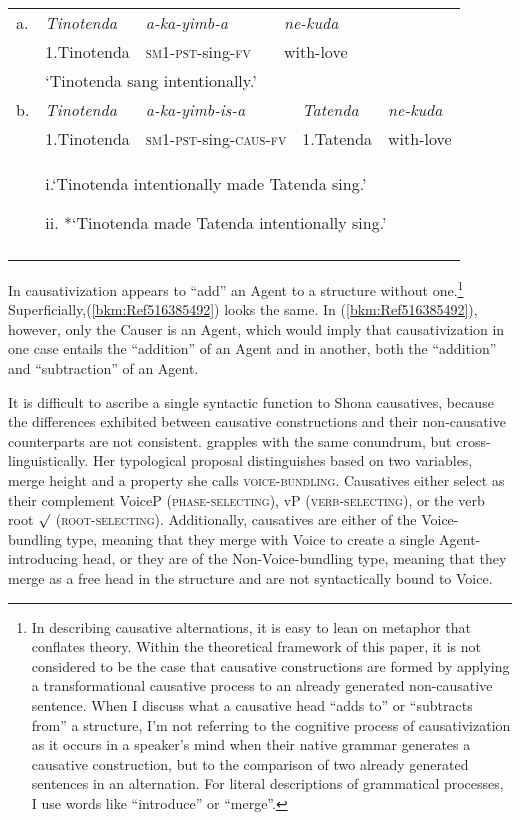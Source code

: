 \documentclass[output=paper,modfonts,nonflat]{langsci/langscibook}
\begin{document}
\tabletail{}
\tablelasttail{}
\begin{tabularx}{\textwidth}{XXXXXX}
\lsptoprule
a. & \textit{Tinotenda} & \textit{a-ka-yimb-a}                & \multicolumn{3}{X}{\textit{ne-kuda}}\\
& 1.Tinotenda & \textsc{sm1-pst-}sing\textsc{{}-fv} & \multicolumn{3}{X}{with-love}\\
& \multicolumn{3}{X}{‘Tinotenda sang intentionally.’} & \multicolumn{2}{X}{}\\
b. & \textit{Tinotenda} & \multicolumn{2}{X}{\textit{a-ka-yimb-is-a}} & \textit{Tatenda} & \textit{ne-kuda}\\
& 1.Tinotenda & \multicolumn{2}{X}{\textsc{sm1-pst-}sing\textsc{{}-caus-fv}} & 1.Tatenda & with-love\\
& \multicolumn{5}{X}{i.‘Tinotenda intentionally made Tatenda sing.’ 

ii. *‘Tinotenda made Tatenda intentionally sing.’}\\
\lspbottomrule
\end{tabularx}
\begin{styleDefault}
In  causativization appears to “add” an Agent to a structure without one.\footnote{In describing causative alternations, it is easy to lean on metaphor that conflates theory. Within the theoretical framework of this paper, it is not considered to be the case that causative constructions are formed by applying a transformational causative process to an already generated non-causative sentence. When I discuss what a causative head “adds to” or “subtracts from” a structure, I’m not referring to the cognitive process of causativization as it occurs in a speaker’s mind when their native grammar generates a causative construction, but to the comparison of two already generated sentences in an alternation. For literal descriptions of grammatical processes, I use words like “introduce” or “merge”.} Superficially,(\ref{bkm:Ref516385492}) looks the same. In (\ref{bkm:Ref516385492}), however, only the Causer is an Agent, which would imply that causativization in one case entails the “addition” of an Agent and in another, both the “addition” and “subtraction” of an Agent.
\end{styleDefault}

\begin{styleDefault}
It is difficult to ascribe a single syntactic function to Shona causatives, because the differences exhibited between causative constructions and their non-causative counterparts are not consistent.  \citet{Pylkkänen2008} grapples with the same conundrum, but cross-linguistically. Her typological proposal distinguishes based on two variables, merge height and a property she calls \textsc{voice-bundling.} Causatives either select as their complement VoiceP  (\textsc{phase-selecting)}, vP \textsc{(verb-selecting)}, or the verb root ${\surd}$ (\textsc{root-selecting)}. Additionally, causatives are either of the Voice-bundling type, meaning that they merge with Voice to create a single Agent-introducing head, or they are of the Non-Voice-bundling type, meaning that they merge as a free head in the structure and are not syntactically bound to Voice. 
\end{styleDefault}
\end{document}
